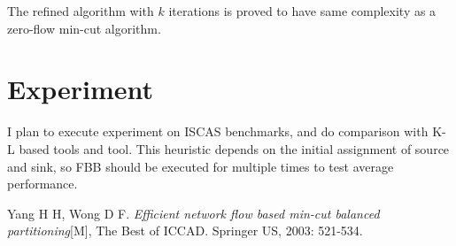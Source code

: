 \documentclass[conference,10pt]{IEEEtran}
\begin{document}
The refined algorithm with $k$ iterations is proved to have same complexity as a zero-flow min-cut algorithm.

\section{Experiment}
I plan to execute experiment on ISCAS benchmarks, and do comparison with K-L based tools and \emph{\HMetis} tool.
This heuristic depends on the initial assignment of source and sink, so FBB should be executed for multiple
times to test average performance.



\begin{thebibliography}{1}
Yang H H, Wong D F. \emph{Efficient network flow based min-cut balanced partitioning}[M], The Best of ICCAD. Springer US, 2003: 521-534.
\end{thebibliography}
\end{document}
